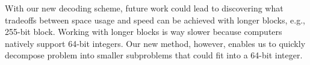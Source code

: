 With our new decoding scheme, future work could lead to discovering what tradeoffs
between space usage and speed can be achieved with longer blocks, e.g., 255-bit block.
Working with longer blocks is way slower because computers natively support 64-bit
integers. Our new method, however, enables us to quickly decompose problem into smaller
subproblems that could fit into a 64-bit integer.



